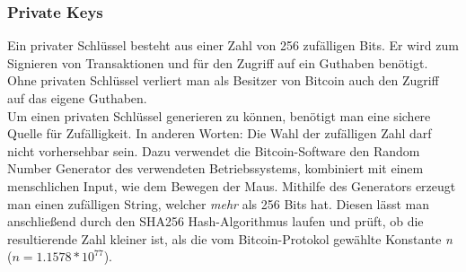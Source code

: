 \subsubsection{Private Keys}
Ein privater Schlüssel besteht aus einer Zahl von 256 zufälligen Bits. Er wird zum Signieren von Transaktionen und für den Zugriff auf ein Guthaben benötigt. Ohne privaten Schlüssel verliert man als Besitzer von Bitcoin auch den Zugriff auf das eigene Guthaben.\\
Um einen privaten Schlüssel generieren zu können, benötigt man eine sichere Quelle für Zufälligkeit. In anderen Worten: Die Wahl der zufälligen Zahl darf nicht vorhersehbar sein. Dazu verwendet die Bitcoin-Software den Random Number Generator des verwendeten Betriebssystems, kombiniert mit einem menschlichen Input, wie dem Bewegen der Maus. Mithilfe des Generators erzeugt man einen zufälligen String, welcher \emph{mehr} als 256 Bits hat. Diesen lässt man anschließend durch den SHA256 Hash-Algorithmus laufen und prüft, ob die resultierende Zahl kleiner ist, als die vom Bitcoin-Protokol gewählte Konstante \emph{n} ($n = 1.1578 * 10^{77}$).

